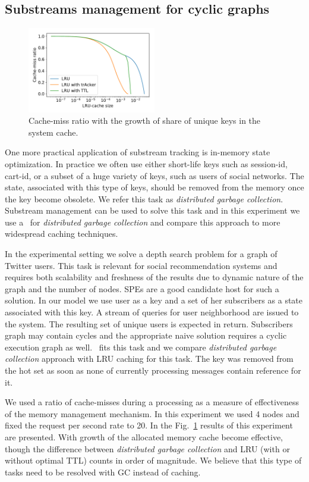 \subsection{Substreams management for cyclic graphs}
\begin{figure}[htbp]
  \centering
  \includegraphics[width=0.50\textwidth]{pics/dgc_lru_depth_search.pdf}
  \caption{Cache-miss ratio with the growth of share of unique keys in the system cache.}
  \label{fig:dgc_lru_depth_search}
\end{figure}

One more practical application of substream tracking is in-memory state optimization. In practice we often use either short-life keys such as session-id, cart-id, or a subset of a huge variety of keys, such as users of social networks. The state, associated with this type of keys, should be removed from the memory once the key become obsolete. We refer this task as \textit{distributed garbage collection}. Substream management can be used to solve this task and in this experiment we use a \tracker\ for \textit{distributed garbage collection} and compare this approach to more widespread caching techniques.

In the experimental setting we solve a depth search problem for a graph of Twitter users. This task is relevant for social recommendation systems and requires both scalability and freshness of the results due to dynamic nature of the graph and the number of nodes. SPEs are a good candidate host for such a solution. In our model we use user as a key and a set of her subscribers as a state associated with this key. A stream of queries for user neighborhood are issued to the system. The resulting set of unique users is expected in return. Subscribers graph may contain cycles and the appropriate naive solution requires a cyclic execution graph as well. \tracker\ fits this task and we compare \textit{distributed garbage collection} approach with LRU caching for this task. The key was removed from the hot set as soon as none of currently processing messages contain reference for it.

We used a ratio of cache-misses during a processing as a measure of effectiveness of the memory management mechanism. In this experiment we used 4 nodes and fixed the request per second rate to 20. In the Fig.~\ref{fig:dgc_lru_depth_search} results of this experiment are presented. With growth of the allocated memory cache become effective, though the difference between 
\textit{distributed garbage collection} and LRU (with or without optimal TTL) counts in order of magnitude. We believe that this type of tasks need to be resolved with GC instead of caching.
